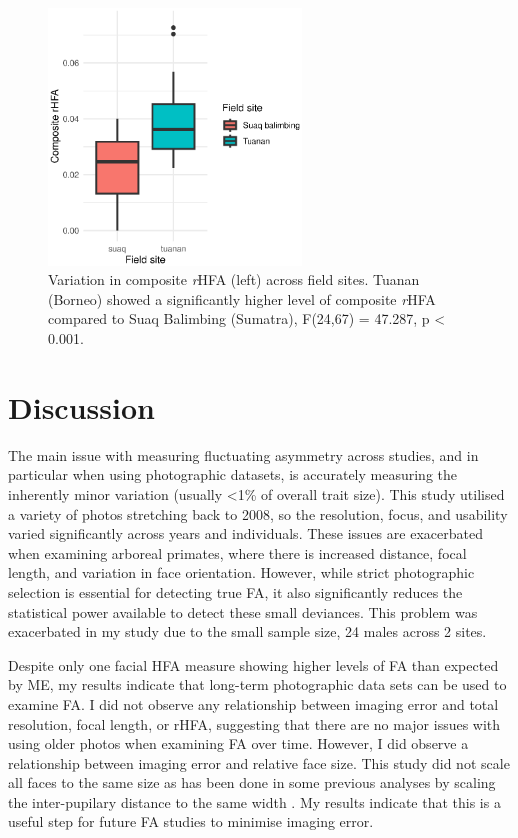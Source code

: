 \begin{figure}[htbp!] 
\centering    
\includegraphics[width=0.6\textwidth]{Chapter2/Figs/Vector/compositefaboxplot.eps}
\caption{Variation in composite \textit{r}HFA (left) across field sites. Tuanan (Borneo) showed a significantly higher level of composite \textit{r}HFA compared to Suaq Balimbing (Sumatra), F(24,67) = 47.287, p < 0.001.}
\label{fig:Variation in composite rHFA (left) across field sites.}
\end{figure}
\section{Discussion}

The main issue with measuring fluctuating asymmetry across studies, and in particular when using photographic datasets, is accurately measuring the inherently minor variation (usually <1\% of overall trait size). This study utilised a variety of photos stretching back to 2008, so the resolution, focus, and usability varied significantly across years and individuals. These issues are exacerbated when examining arboreal primates, where there is increased distance, focal length, and variation in face orientation. However, while strict photographic selection is essential for detecting true FA, it also significantly reduces the statistical power available to detect these small deviances. This problem was exacerbated in my study due to the small sample size, 24 males across 2 sites. 

Despite only one facial HFA measure showing higher levels of FA than expected by ME, my results indicate that long-term photographic data sets can be used to examine FA. I did not observe any relationship between imaging error and total resolution, focal length, or rHFA, suggesting that there are no major issues with using older photos when examining FA over time. However, I did observe a relationship between imaging error and relative face size. This study did not scale all faces to the same size as has been done in some previous analyses by scaling the inter-pupilary distance to the same width \citep{Little.2008}. My results indicate that this is a useful step for future FA studies to minimise imaging error.


